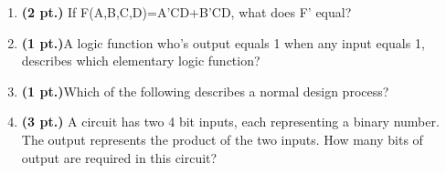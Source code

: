 \documentclass{article}
\begin{document}
\begin{enumerate}
\item {\bf (2 pt.)} If F(A,B,C,D)=A'CD+B'CD, what does F' equal?

\pagebreak
\item {\bf (1 pt.)}A logic function who's output equals 1 when any 
input equals 1, describes which elementary logic function?

\item {\bf (1 pt.)}Which of the following describes a normal
design process?

\item {\bf (3 pt.)} A circuit has two 4 bit inputs, each representing 
a binary number.  The output represents the product of the two inputs.  
How many bits of output are required in this circuit? 


\end{enumerate}
\end{document}
